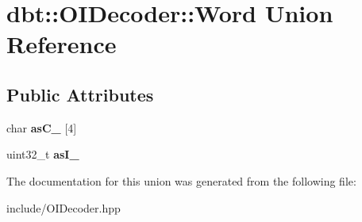 \hypertarget{uniondbt_1_1_o_i_decoder_1_1_word}{}\section{dbt\+:\+:O\+I\+Decoder\+:\+:Word Union Reference}
\label{uniondbt_1_1_o_i_decoder_1_1_word}
\subsection*{Public Attributes}
\begin{DoxyCompactItemize}
\item 
char {\bfseries as\+C\+\_\+} \mbox{[}4\mbox{]}\hypertarget{uniondbt_1_1_o_i_decoder_1_1_word_a6e9b758f5dcf8dc12ec8469e7866f455}{}\label{uniondbt_1_1_o_i_decoder_1_1_word_a6e9b758f5dcf8dc12ec8469e7866f455}

\item 
uint32\+\_\+t {\bfseries as\+I\+\_\+}\hypertarget{uniondbt_1_1_o_i_decoder_1_1_word_a94a640382cb1fb6ae109e17de4eb928f}{}\label{uniondbt_1_1_o_i_decoder_1_1_word_a94a640382cb1fb6ae109e17de4eb928f}

\end{DoxyCompactItemize}


The documentation for this union was generated from the following file\+:\begin{DoxyCompactItemize}
\item 
include/O\+I\+Decoder.\+hpp\end{DoxyCompactItemize}
